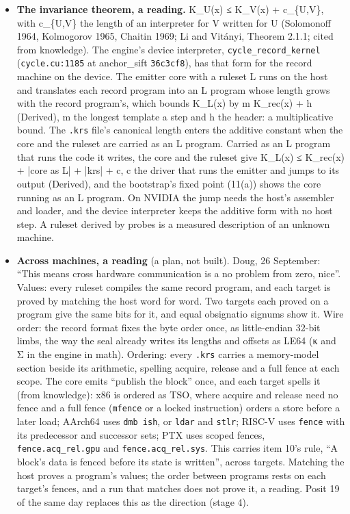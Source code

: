 \begin{enumerate}
\begin{itemize}
\begin{enumerate}
\begin{itemize}
\item \textbf{The invariance theorem, a reading.} K\_\allowbreak{}U(x) ≤ K\_\allowbreak{}V(x) + c\_\allowbreak{}\{U,V\}, with c\_\allowbreak{}\{U,V\} the length of an interpreter for V written for U (Solomonoff 1964, Kolmogorov 1965, Chaitin 1969; Li and Vitányi, Theorem 2.1.1; cited from knowledge). The engine's device interpreter, \texttt{cycle\_\allowbreak{}record\_\allowbreak{}kernel} (\texttt{cycle.\allowbreak{}cu:1185} at anchor\_\allowbreak{}sift \texttt{36c3cf8}), has that form for the record machine on the device. The emitter core with a ruleset L runs on the host and translates each record program into an L program whose length grows with the record program's, which bounds K\_\allowbreak{}L(x) by m K\_\allowbreak{}rec(x) + h (Derived), m the longest template a step and h the header: a multiplicative bound. The \texttt{.\allowbreak{}krs} file's canonical length enters the additive constant when the core and the ruleset are carried as an L program. Carried as an L program that runs the code it writes, the core and the ruleset give K\_\allowbreak{}L(x) ≤ K\_\allowbreak{}rec(x) + |core as L| + |krs| + c, c the driver that runs the emitter and jumps to its output (Derived), and the bootstrap's fixed point (11(a)) shows the core running as an L program. On NVIDIA the jump needs the host's assembler and loader, and the device interpreter keeps the additive form with no host step. A ruleset derived by probes is a measured description of an unknown machine.
\item \textbf{Across machines, a reading} (a plan, not built). Doug, 26 September: “This means cross hardware communication is a no problem from zero, nice”. Values: every ruleset compiles the same record program, and each target is proved by matching the host word for word. Two targets each proved on a program give the same bits for it, and equal obsignatio signums show it. Wire order: the record format fixes the byte order once, as little-endian 32-bit limbs, the way the seal already writes its lengths and offsets as LE64 (κ and Σ in the engine in math). Ordering: every \texttt{.\allowbreak{}krs} carries a memory-model section beside its arithmetic, spelling acquire, release and a full fence at each scope. The core emits “publish the block” once, and each target spells it (from knowledge): x86 is ordered as TSO, where acquire and release need no fence and a full fence (\texttt{mfence} or a locked instruction) orders a store before a later load; AArch64 uses \texttt{dmb ish}, or \texttt{ldar} and \texttt{stlr}; RISC-V uses \texttt{fence} with its predecessor and successor sets; PTX uses scoped fences, \texttt{fence.acq\_\allowbreak{}rel.gpu} and \texttt{fence.acq\_\allowbreak{}rel.sys}. This carries item 10's rule, “A block's data is fenced before its state is written”, across targets. Matching the host proves a program's values; the order between programs rests on each target's fences, and a run that matches does not prove it, a reading. Posit 19 of the same day replaces this as the direction (stage 4).

\end{itemize}
\end{enumerate}
\end{itemize}
\end{enumerate}
